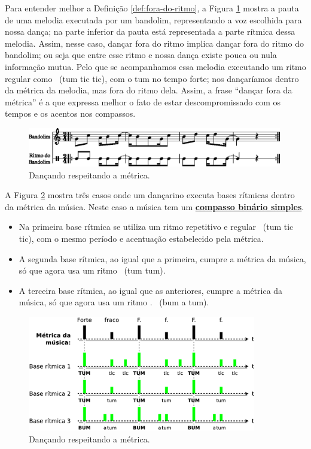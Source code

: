 Para entender melhor a Definição \ref{def:fora-do-ritmo}, a 
Figura \ref{fig:fora-do-ritmo-0-1} mostra a pauta de uma melodia executada por um bandolim, 
representando a voz escolhida para nossa dança; 
na parte inferior da pauta está representada a parte rítmica dessa melodia.
Assim, nesse caso, dançar fora do ritmo implica dançar fora do ritmo do bandolim;
ou seja que entre esse ritmo e nossa dança existe pouca ou nula informação mutua.
Pelo que se acompanhamos essa melodia executando um ritmo regular como 
\Vier \Acht \Acht~(tum tic tic), com o tum no tempo forte;
nos dançaríamos dentro da métrica da melodia,
mas fora do ritmo dela. 
Assim, a frase ``dançar fora da métrica'' é a que expressa melhor o fato de estar descompromissado com os tempos
e os acentos nos compassos. 
\begin{figure}[!h]
    \centering 
    \includegraphics[width=0.99\textwidth]{chapters/cap-musicalidade/fora-do-ritmo-0-1.eps}
    \caption{Dançando respeitando a métrica.}
    \label{fig:fora-do-ritmo-0-1}
\end{figure}

\begin{example}
A Figura \ref{fig:fora-do-ritmo-com} mostra três casos onde um dançarino
executa bases rítmicas dentro da métrica da música. 
Neste caso a música  tem um \hyperref[subsec:compassobinario]{\textbf{compasso binário simples}}.
\begin{itemize}
\item Na primeira base rítmica se utiliza um ritmo repetitivo e regular \Vier \Acht \Acht~(tum tic tic),
com o mesmo período e acentuação estabelecido pela métrica. 
\item A segunda base rítmica, ao igual que a primeira, cumpre a métrica da música,
só que agora usa um ritmo \Vier \Vier~(tum tum).
\item A terceira base rítmica, ao igual que as anteriores, cumpre a métrica da música,
só que agora usa um ritmo \Acht. \Sech \Vier~(bum a tum).
\end{itemize}
\end{example}

\begin{figure}[!h]
    \centering 
    \includegraphics[width=0.89\textwidth]{chapters/cap-musicalidade/fora-do-ritmo-com.eps}
    \caption{Dançando respeitando a métrica.}
    \label{fig:fora-do-ritmo-com}
\end{figure}

